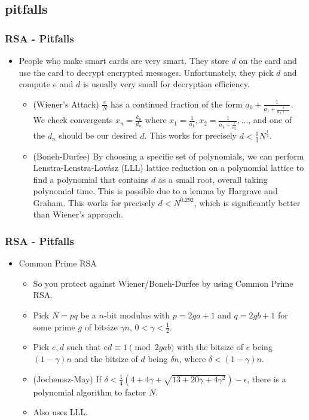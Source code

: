 \documentclass[aspectratio=169,t]{beamer}
\begin{document}
\subsection{pitfalls}
\begin{frame}
\frametitle{RSA - Pitfalls}
\begin{itemize}
\item
People who make smart cards are very smart. They store $d$ on the card and use
the card to decrypt encrypted messages. Unfortunately, they pick $d$ and compute
$e$ and $d$ is usually very small for decryption efficiency. \pause
\begin{itemize}
\item
(Wiener's Attack) $\frac{e}{N}$ has a continued fraction of the form $a_0 +
\frac{1}{a_1 + \frac{1}{a_2 + \cdots}}$. We check convergents $x_n =
\frac{k_n}{d_n}$ where $x_1 = \frac{1}{a_1}, x_2 = \frac{1}{a_1 +
\frac{1}{a_2}}, \dots$, and one of the $d_n$ should be our desired $d$. This
works for precisely $d < \frac{1}{3} N^{\frac{1}{4}}$. \pause
\item
(Boneh-Durfee) By choosing a specific set of polynomials, we can perform
Lenstra-Lenstra-Lov\'{a}sz (LLL) lattice reduction on a polynomial lattice to
find a polynomial that contains $d$ as a small root, overall taking polynomial
time. This is possible due to a lemma by Hargrave and Graham. This works for
precisely $d < N^{0.292}$, which is significantly better than Wiener's approach.
\end{itemize}
\end{itemize}
\end{frame}

\begin{frame}
\frametitle{RSA - Pitfalls}
\begin{itemize}
\item
Common Prime RSA
\begin{itemize}
\item
So you protect against Wiener/Boneh-Durfee by using Common Prime RSA. \pause
\item
Pick $N = pq$ be a $n$-bit modulus with $p = 2ga + 1$ and $q = 2gb + 1$ for some
prime $g$ of bitsize $\gamma n$, $0 < \gamma < \frac{1}{2}$.
\item
Pick $e, d$ such that $ed \equiv 1 \pmod{2gab}$ with the bitsize of $e$ being
$(1 - \gamma)n$ and the bitsize of $d$ being $\delta n$, where $\delta < (1 -
\gamma) n$. \pause
\item
(Jochemsz-May) If $\delta < \frac{1}{4} (4 + 4 \gamma + \sqrt{13 + 20 \gamma + 4
\gamma^2}) - \epsilon$, there is a polynomial algorithm to factor $N$.
\item
Also uses LLL.
\end{itemize}
\end{itemize}
\end{frame}
\end{document}
